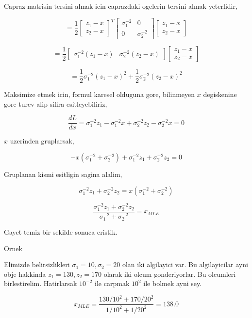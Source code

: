 \documentclass[12pt,fleqn]{article}\usepackage{../common}
\begin{document}
Capraz matrisin tersini almak icin caprazdaki ogelerin tersini almak
yeterlidir,

$$ = \frac{1}{2}  
\left[\begin{array}{c}
z_1-x \\ z_2-x
\end{array}\right]^T
\left[\begin{array}{cc}
\sigma_1^{-2} & 0 \\
0 & \sigma_2^{-2} 
\end{array}\right]
\left[\begin{array}{c}
z_1-x \\ z_2-x
\end{array}\right]
$$

$$ = \frac{1}{2}  
\left[\begin{array}{cc}
\sigma_1^{-2}(z_1-x) & \sigma_2^{-2} (z_2-x)
\end{array}\right]
\left[\begin{array}{c}
z_1-x \\ z_2-x
\end{array}\right]
$$

$$ = 
\frac{1}{2}\sigma_1^{-2}(z_1-x)^2 + \frac{1}{2}\sigma_2^{-2} (z_2-x)^2
$$

Maksimize etmek icin, formul karesel olduguna gore, bilinmeyen $x$
degiskenine gore turev alip sifira esitleyebiliriz,

$$ 
\frac{dL}{dx} = \sigma_1^{-2}z_1-\sigma_1^{-2}x + \sigma_2^{-2}z_2-\sigma_2^{-2}x = 0
$$

$x$ uzerinden gruplarsak,

$$ 
-x(\sigma_1^{-2}+\sigma_2^{-2}) + \sigma_1^{-2}z_1+ \sigma_2^{-2}z_2 = 0
$$

Gruplanan kismi esitligin sagina alalim,

$$ 
\sigma_1^{-2}z_1+ \sigma_2^{-2}z_2 = x(\sigma_1^{-2}+\sigma_2^{-2}) 
$$

$$ 
\frac{\sigma_1^{-2}z_1+ \sigma_2^{-2}z_2 }{\sigma_1^{-2}+\sigma_2^{-2}}= x_{MLE}
$$

Gayet temiz bir sekilde sonuca eristik. 

Ornek

Elimizde belirsizlikleri $\sigma_1=10,\sigma_2=20$ olan iki algilayici
var. Bu algilayicilar ayni obje hakkinda $z_1=130,z_2=170$ olarak iki olcum
gonderiyorlar. Bu olcumleri birlestirelim. Hatirlarsak $10^{-2}$ ile
carpmak $10^{2}$ ile bolmek ayni sey.

$$ x_{MLE} =
\frac{130/10^2 + 170/20^2}{1/10^2 + 1/20^2} = 138.0
$$
\end{document}
